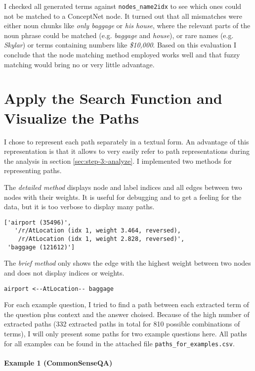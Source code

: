 \documentclass{article}
\begin{document}
I checked all generated terms against \verb|nodes_name2idx| to see
which ones could not be matched to a ConceptNet node.  It turned out
that all mismatches were either noun chunks like \emph{only baggage}
or \emph{his house}, where the relevant parts of the noun phrase could
be matched (e.g. \emph{baggage} and \emph{house}), or rare names
(e.g. \emph{Skylar}) or terms containing numbers like \emph{\$10,000}. Based
on this evaluation I conclude that the node matching method employed
works well and that fuzzy matching would bring no or very little
advantage.

\section{Apply the Search Function and Visualize the Paths}
\label{sec:step-2:-use}

I chose to represent each path separately in a textual form. An
advantage of this representation is that it allows to very easily
refer to path representations during the analysis in
section \ref{sec:step-3:-analyze}.  I implemented two methods for
representing paths.

The \emph{detailed method} displays node and label indices and all edges
between two nodes with their weights. It is useful for debugging and
to get a feeling for the data, but it is too verbose to display many
paths.

\begin{verbatim}
['airport (35496)',
   '/r/AtLocation (idx 1, weight 3.464, reversed),
    /r/AtLocation (idx 1, weight 2.828, reversed)',
 'baggage (121612)']
\end{verbatim}

The \emph{brief method} only shows the edge with the highest weight
between two nodes and does not display indices or weights.

\begin{verbatim}
airport <--AtLocation-- baggage
\end{verbatim}

For each example question, I tried to find a path between each
extracted term of the question plus context and the answer
choised.   Because of the high number of extracted paths (332 extracted
paths in total for 810 possible combinations of terms), I will only
present some paths for two example questions here. All paths for all
examples can be found in the attached file
\verb|paths_for_examples.csv|.


\paragraph{Example 1 (CommonSenseQA)}
\end{document}
